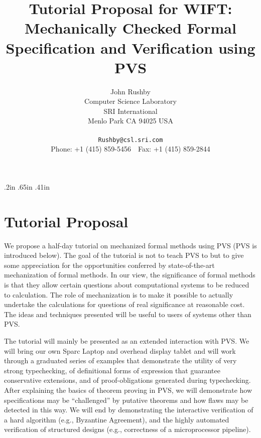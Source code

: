 \topmargin .2in
\textwidth 5.5in
\textheight 7.75in
\oddsidemargin .65in
\evensidemargin .41in
\sloppy
\title{\bf Tutorial Proposal for WIFT:\\
Mechanically Checked Formal Specification and Verification using PVS}
\author{John Rushby\\
Computer Science Laboratory\\
SRI International\\
Menlo Park CA 94025 USA
\\ \mbox{ }\\
{\tt Rushby@csl.sri.com}
\\Phone: +1 (415) 859-5456\ \ Fax: +1 (415) 859-2844
}

\date{}

\maketitle

\section{Tutorial Proposal}

We propose a half-day tutorial on mechanized formal methods using PVS
(PVS is introduced below).  The goal of the tutorial is not to teach
PVS to but to give some appreciation for the opportunities conferred
by state-of-the-art mechanization of formal methods.  In our view, the
significance of formal methods is that they allow certain questions
about computational systems to be reduced to calculation.  The
role of mechanization is to make it possible to actually undertake the
calculations for questions of real significance at reasonable cost.
The ideas and techniques presented will be useful to users of systems
other than PVS.

The tutorial will mainly be presented as an extended interaction with
PVS\@.  We will bring our own Sparc Laptop and overhead display tablet
and will work through a graduated series of examples that demonstrate
the utility of very strong typechecking, of definitional forms of
expression that guarantee conservative extensions, and of
proof-obligations generated during typechecking.  After explaining the
basics of theorem proving in PVS, we will demonstrate how
specifications may be ``challenged'' by putative theorems and how
flaws may be detected in this way.  We will end by demonstrating the
interactive verification of a hard algorithm (e.g., Byzantine
Agreement), and the highly automated verification of structured
designs (e.g., correctness of a microprocessor pipeline).

